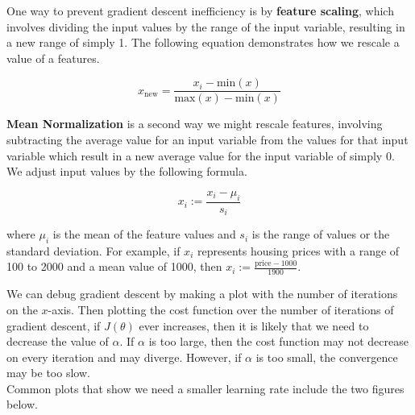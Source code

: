 \noindent One way to prevent gradient descent inefficiency is by \textbf{feature scaling}, which
involves dividing the input values by the range of the input variable, resulting in a new range of
simply 1. The following equation demonstrates how we rescale a value of a features.

\begin{equation*}
    x_{\text{new}} = \frac{x_i-\text{min}(x)}{\text{max}(x)-\text{min}(x)}
\end{equation*}

\noindent \textbf{Mean Normalization} is a second way we might rescale features, involving subtracting
the average value for an input variable from the values for that input variable which result in a new
average value for the input variable of simply 0. We adjust input values by the following formula.

\begin{equation*}
    x_i := \frac{x_i - \mu_i}{s_i}
\end{equation*}

\noindent where $\mu_i$ is the mean of the feature values and $s_i$ is the range of values or the
standard deviation. For example, if $x_i$ represents housing prices with a range of 100 to 2000
and a mean value of 1000, then $x_i := \frac{\text{price}-1000}{1900}$.

\pagebreak
\noindent We can debug gradient descent by making a plot with the number of iterations on the $x$-axis.
Then plotting the cost function over the number of iterations of gradient descent, if $J(\theta)$ ever
increases, then it is likely that we need to decrease the value of $\alpha$. If $\alpha$ is too large,
then the cost function may not decrease on every iteration and may diverge. However, if $\alpha$ is
too small, the convergence may be too slow. \\

\noindent Common plots that show we need a smaller learning rate include the two figures below.


